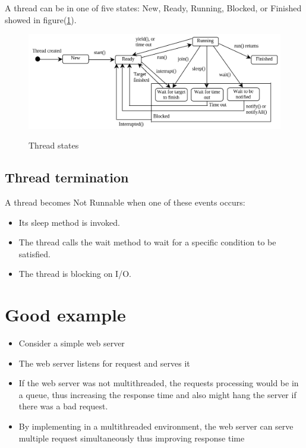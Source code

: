 \documentclass[12pt, a4paper]{book}
\begin{document}
A thread can be in one of five states: New, Ready, Running, Blocked, or Finished showed in figure(\ref{fig:thread-states-detaild}).
\begin{figure}[!h]
    \centering
    \includegraphics[width=0.9\linewidth]{figures/thread-states-detaild.png}
    \label{fig:thread-states-detaild}
    \caption{Thread states}
\end{figure}

\subsection{Thread termination}
A thread becomes Not Runnable when one of these events occurs:
\begin{itemize}
    \item  Its sleep method is invoked.
    \item  The thread calls the wait method to wait for a specific condition to be satisfied.
    \item  The thread is blocking on I/O.
\end{itemize}
\section{Good example}
\begin{itemize}
    \item Consider a simple web server
    \item    The web server listens for request and serves it
    \item If the web server was not multithreaded, the requests processing would be in a queue, thus increasing the response time and also might hang the server if there was a bad request.
    \item By implementing in a multithreaded environment, the web server can serve multiple request simultaneously thus improving response time
\end{itemize}
\end{document}
